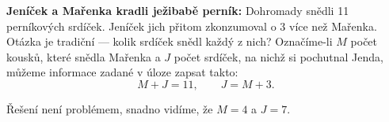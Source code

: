 \wikitextrule
\begin{example}\label{mai:exam037}
  \textbf{Jeníček a Mařenka kradli ježibabě perník:}\newline\small
  Dohromady snědli \num{11} perníkových srdíček. Jeníček jich přitom zkonzumoval o \num{3} více než 
  Mařenka. Otázka je tradiční — kolik srdíček snědl každý z nich? Označíme-li \(M\) počet kousků, 
  které snědla Mařenka a \(J\) počet srdíček, na nichž si pochutnal Jenda, můžeme informace zadané 
  v úloze zapsat takto:
  \begin{equation*}
    M + J = 11, \qquad J = M + 3.
  \end{equation*}
  
  Řešení není problémem, snadno vidíme, že \(M = 4\) a \(J = 7\).
  \normalsize
\end{example}